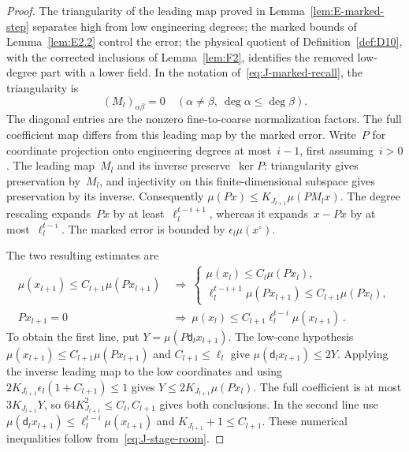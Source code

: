 \begin{proof}\label{proof:J-graded-start}
The triangularity of the leading map proved in Lemma~\ref{lem:E-marked-step} separates high from low engineering degrees; the marked bounds of Lemma~\ref{lem:E2.2} control the error; the physical quotient of Definition~\ref{def:D10}, with the corrected inclusions of Lemma~\ref{lem:F2}, identifies the removed low-degree part with a lower field. In the notation of~\eqref{eq:J-marked-recall}, the triangularity is
\begin{equation*}
(M_l)_{\alpha\beta}=0\quad
(\alpha\ne\beta,\ \deg\alpha\le\deg\beta).
\end{equation*}
The diagonal entries are the nonzero fine-to-coarse normalization factors. The full coefficient map differs from this leading map by the marked error. Write~$P$ for coordinate projection onto engineering degrees at most~$i-1$, first assuming~$i>0$. The leading map~$M_l$ and its inverse preserve~$\ker P$: triangularity gives preservation by~$M_l$, and injectivity on this finite-dimensional subspace gives preservation by its inverse. Consequently $\mu(Px)\le K_{J_{l+1}}\mu(PM_lx)$.
The degree rescaling expands~$Px$ by at least~$\ell_l^{t-i+1}$, whereas it expands~$x-Px$ by at most~$\ell_l^{t-i}$. The marked error is bounded by $\epsilon_l\mu(x^\circ)$.

The two resulting estimates are
\begin{align*}
\mu(x_{l+1})\le C_{l+1}\mu(Px_{l+1})
&\ \Longrightarrow\
\begin{cases}
\mu(x_l)\le C_l\mu(Px_l),\\
\ell_l^{t-i+1}\mu(Px_{l+1})\le C_{l+1}\mu(Px_l),
\end{cases}\\
Px_{l+1}=0&\ \Longrightarrow\
\mu(x_l)\le C_{l+1}\ell_l^{t-i}\mu(x_{l+1})\,.
\end{align*}
To obtain the first line, put $Y=\mu(P\mathsf d_lx_{l+1})$. The low-cone hypothesis $\mu(x_{l+1})\le C_{l+1}\mu(Px_{l+1})$ and $C_{l+1}\le\ell_l$ give $\mu(\mathsf d_lx_{l+1})\le2Y$. Applying the inverse leading map to the low coordinates and using $2K_{J_{l+1}}\epsilon_l(1+C_{l+1})\le1$ gives $Y\le2K_{J_{l+1}}\mu(Px_l)$. The full coefficient is at most $3K_{J_{l+1}}Y$, so $64K_{J_{l+1}}^2\le C_l,C_{l+1}$ gives both conclusions. In the second line use $\mu(\mathsf d_lx_{l+1})\le\ell_l^{t-i}\mu(x_{l+1})$ and $K_{J_{l+1}}+1\le C_{l+1}$. These numerical inequalities follow from~\eqref{eq:J-stage-room}.


\end{proof}
